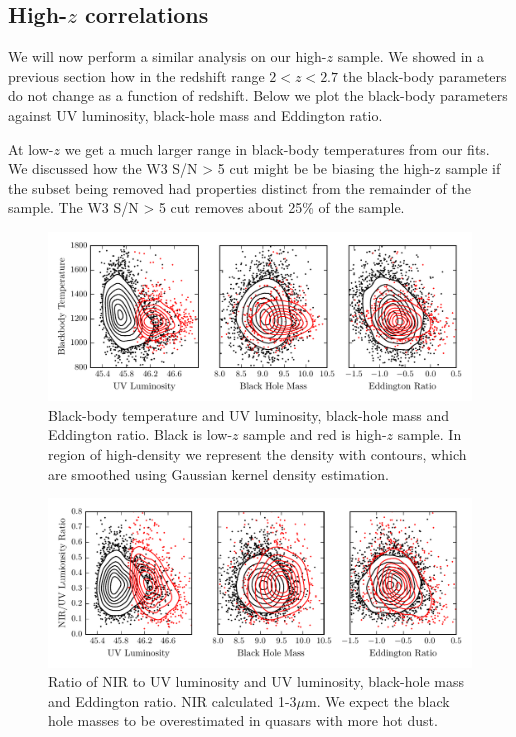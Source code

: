 \subsection{High-$z$ correlations}

We will now perform a similar analysis on our high-$z$ sample. We showed in a previous section how in the redshift range $2 < z < 2.7$ the black-body parameters do not change as a function of redshift. Below we plot the black-body parameters against UV luminosity, black-hole mass and Eddington ratio. 

At low-$z$  we get a much larger range in black-body temperatures from our fits. We discussed how the W3 S/N > 5 cut might be be biasing the high-z sample if the subset being removed had properties distinct from the remainder of the sample. The W3 S/N > 5 cut removes about 25\% of the sample. 

\begin{figure}
  \centering
  \includegraphics[width=\textwidth]{figures/chapter06/bbt_correlations_contour.pdf}
  \caption{Black-body temperature and UV luminosity, black-hole mass and Eddington ratio. Black is low-$z$ sample and red is high-$z$ sample. In region of high-density we represent the density with contours, which are smoothed using Gaussian kernel density estimation.}
  \label{fig:}
\end{figure}

\begin{figure}
  \centering
  \includegraphics[width=\textwidth]{figures/chapter06/ratio_correlations_contour.pdf}
  \caption{Ratio of NIR to UV luminosity and UV luminosity, black-hole mass and Eddington ratio. NIR calculated 1-3$\mu$m. We expect the black hole masses to be overestimated in quasars with more hot dust. }
  \label{fig:}
\end{figure}

